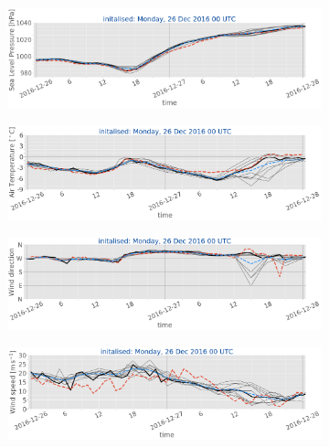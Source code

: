 \begin{figure}[H]\ContinuedFloat
	\centering
	\begin{subfigure}[b]{0.49\textwidth}
		\includegraphics[trim={0.cm 5.cm 0cm 0cm},clip,
		width=\textwidth]{./fig_sfc_pressure/20161226_00}
		\caption{}\label{fig:res:sfc_pres26}
	\end{subfigure}
	
	\begin{subfigure}[b]{0.49\textwidth}
		\includegraphics[trim={0.cm 5.cm 0cm 0cm},clip,
		width=\textwidth]{./fig_sfc_temp/20161226_00}
		\caption{}\label{fig:res:sfc_temp26}
	\end{subfigure}
	
	\begin{subfigure}[b]{0.49\textwidth}
		\includegraphics[trim={0.cm 5.cm 0cm 0cm},clip,
		width=\textwidth]{./fig_sfc_wd/20161226_00}
		\caption{}\label{fig:res:sfc_wd26}
	\end{subfigure}
	
	\begin{subfigure}[b]{0.49\textwidth}
		\includegraphics[trim={0.cm 5.cm 0cm 0cm},clip,
		width=\textwidth]{./fig_sfc_ws/20161226_00}
		\caption{}\label{fig:res:sfc_ws26}
	\end{subfigure}
	

\end{figure}
